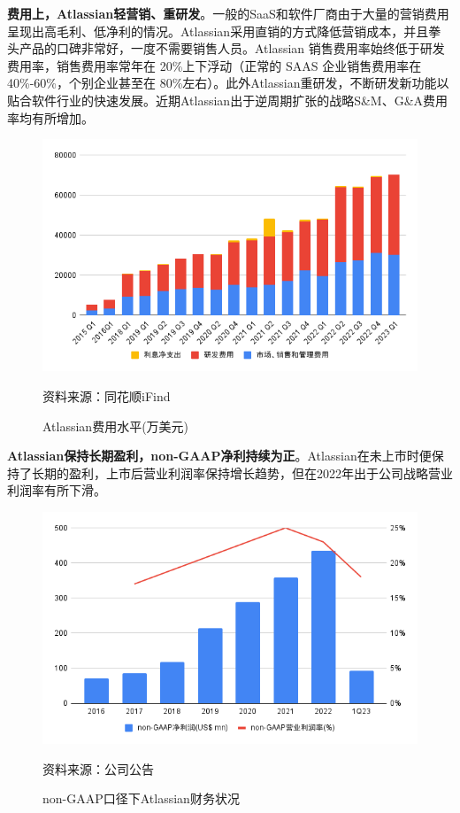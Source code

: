 \textbf{费用上，Atlassian轻营销、重研发}。一般的SaaS和软件厂商由于大量的营销费用呈现出高毛利、低净利的情况。Atlassian采用直销的方式降低营销成本，并且拳头产品的口碑非常好，一度不需要销售人员。Atlassian 销售费用率始终低于研发费用率，销售费用率常年在 20\%上下浮动（正常的 SAAS 企业销售费用率在40\%-60\%，个别企业甚至在 80\%左右）。此外Atlassian重研发，不断研发新功能以贴合软件行业的快速发展。近期Atlassian出于逆周期扩张的战略S\&M、G\&A费用率均有所增加。
\begin{figure}[H]
    \caption{Atlassian费用水平(万美元)}
    \begin{center}
        \includegraphics[width=0.8\linewidth]{img/cost.png}
    \end{center}
    \footnotesize{资料来源：同花顺iFind}
\end{figure}

\textbf{Atlassian保持长期盈利，non-GAAP净利持续为正}。Atlassian在未上市时便保持了长期的盈利，上市后营业利润率保持增长趋势，但在2022年出于公司战略营业利润率有所下滑。
\begin{figure}[H]
    \caption{non-GAAP口径下Atlassian财务状况}
    \begin{center}
        \includegraphics[width=0.7\linewidth]{img/non-GAAP.png}
    \end{center}
    \footnotesize{资料来源：公司公告}
\end{figure}

